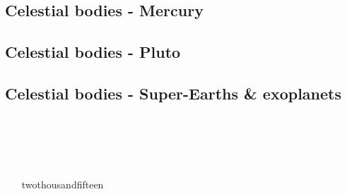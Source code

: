 \subsection{Celestial bodies - Mercury}

\begin{scriptsize}
\begin{itemize}
\item[\twothousandseven] 
\textcite{reki07} 
\item[\twothousandeight] 
\textcite{king08} 
\item[\twothousandtwelve] 
\textcite{roba12}  
\item[\twothousandtwentyone] 
\textcite{gult21} 
\end{itemize}
\end{scriptsize}

\subsection{Celestial bodies - Pluto}

\begin{scriptsize}
\begin{itemize}
\item[\twothousandsixteen] \textcite{mcnw16} 
\end{itemize}
\end{scriptsize}

\subsection{Celestial bodies - Super-Earths \& exoplanets}

\begin{scriptsize}
\begin{itemize}
\item[\twothousandeleven]
\textcite{stfl11} \\
\textcite{vata11} \\
\item[\twothousandthirteen]
\textcite{stlh13} \\
\item[twothousandfifteen] 
\textcite{welo15} \\
\textcite{miko15} \\
\textcite{kamo15} \\
\end{itemize}
\end{scriptsize}

